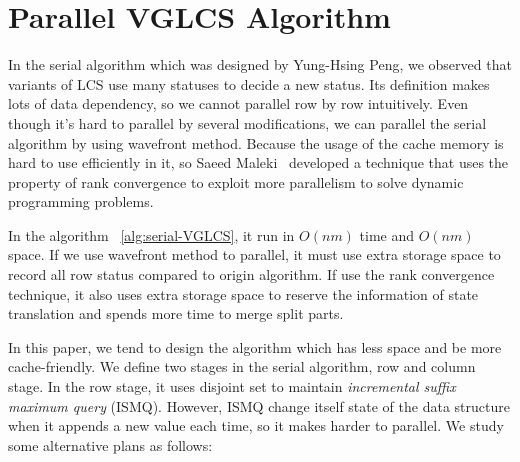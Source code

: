 \section{Parallel VGLCS Algorithm} %
\label{sec:parallelSerial}

In the serial algorithm which was designed by Yung-Hsing Peng, we
observed that variants of LCS use many statuses to decide a new
status. Its definition makes lots of data dependency, so we cannot
parallel row by row intuitively.  Even though it's hard to parallel by
several modifications, we can parallel the serial algorithm by using
wavefront method.  Because the usage of the cache memory is hard to
use efficiently in it, so Saeed Maleki~\cite{Maleki2016EfficientPU}
developed a technique that uses the property of rank convergence to
exploit more parallelism to solve dynamic programming problems.

\iffalse
在 $O(nm \alpha(n))$ 的序列算法 \ref{alg:serial-VGLCS} 中，
我們發現算法如大多數的變型 LCS 相同，依賴數個狀態以轉移當前狀態，
大量的資料依賴性不易於細粒度平行。使用波前運行平行是一種常見的解決方案，
由於這種平行對於運行時的快取不友善 (cache-unfriendly)，
在 Saeed Maleki ~\cite{saeed} 論文中提到如何使用 Rank Convergence 的特殊性質，
拓展出更高平行度來解決動態規劃的相關問題。
\fi



In the algorithm ~\ref{alg:serial-VGLCS}, it run in $O(nm)$
time and $O(nm)$ space.  If we use wavefront method to parallel, it
must use extra storage space to record all row status compared to
origin algorithm.  If use the rank convergence technique, it also uses
extra storage space to reserve the information of state translation
and spends more time to merge split parts.

\iffalse
序列算法的空間複雜度為 $O(nm)$。若使用波前平行，需要同時維護橫向的所有狀態，
需要多付出一倍的空間量。若加入 Rank Convergence 的想法拓展出，
勢必要記錄轉移的狀態，需要耗費更多的記憶體空間，用以在最後階段合併所用。
\fi

In this paper, we tend to design the algorithm which has less space
and be more cache-friendly.  We define two stages in the serial
algorithm, row and column stage.  In the row stage, it uses disjoint
set to maintain \emph{incremental suffix maximum query} (ISMQ).
However, ISMQ change itself state of the data structure when it
appends a new value each time, so it makes harder to parallel.  We
study some alternative plans as follows:

\iffalse
這裡我們傾向空間複雜度常數小且針對快取友善設計算法。
平行算法主要分成兩個階段－縱向和橫向階段，縱向階段為數個列的後綴極值查找，
橫向階段在行上運行 $n$ 個元素和 $n$ 組詢問。
在橫向階段，我們需要解決增長後綴最大值查找 (\emph{incremental suffix maximum query}, ISMQ)
易於實作的并查集支持單一操作 $O(\alpha(n))$。
然而，在過程中每插入一個元素便改動數據結構以支持下一個後綴詢問，
這部分使得查詢難以平行化。為消除資料相依性，我們找到幾種區間詢問的替代方案。如：
\fi

